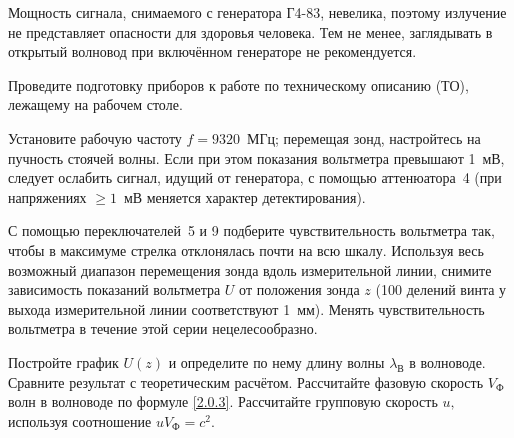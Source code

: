 \begin{lab:task}
    
    
    
    \item Мощность сигнала, снимаемого с генератора Г4-83, невелика, поэтому
    излучение не представляет опасности для здоровья человека. Тем не менее,
    заглядывать в открытый волновод при включённом генераторе не рекомендуется.
    
    
    \item Проведите подготовку приборов к работе по техническому описанию (ТО),
    лежащему на рабочем столе.
    
    \item Установите рабочую частоту $f=9320$~МГц; перемещая зонд, настройтесь на
    пучность стоячей волны. Если при этом показания вольтметра превышают 1~мВ,
    следует ослабить сигнал, идущий от генератора, с помощью аттенюатора~4 (при
    напряжениях $\ge1$~мВ меняется характер детектирования).
    
    \item С помощью переключателей~5 и 9 подберите чувствительность вольтметра так,
    чтобы в максимуме стрелка отклонялась почти на всю шкалу. Используя весь
    возможный диапазон перемещения зонда вдоль измерительной линии, снимите
    зависимость показаний вольтметра $U$ от положения зонда $z$ (100 делений винта
    у выхода измерительной линии соответствуют 1~мм). Менять чувствительность
    вольтметра в течение этой серии нецелесообразно.
    
    \item Постройте график $U(z)$ и определите по нему длину волны
    $\lambda_{\text{В}}$ в волноводе. Сравните результат с теоретическим расчётом.
    Рассчитайте фазовую скорость $V_{\text{Ф}}$ волн в волноводе по формуле
    \eqref{2.0.3}. Рассчитайте групповую скорость $u,$ используя соотношение
    $uV_{\text{Ф}}=c^2.$
    

\end{lab:task}
